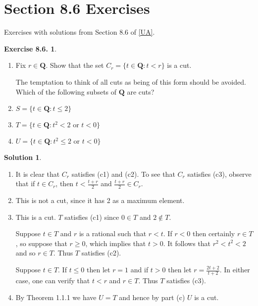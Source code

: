 \documentclass[12pt]{article}
\theoremstyle{definition}
\theoremstyle{exercise}
\newtheorem{exercise}{Exercise 8.6.}
\theoremstyle{solution}
\newtheorem*{solution}{Solution}
\newcommand{\Q}{\mathbf{Q}}
\begin{document}
\section{Section 8.6 Exercises}

Exercises with solutions from Section 8.6 of \hyperlink{ua}{[UA]}.

\begin{exercise}
\label{ex:1}
    \begin{enumerate}
        \item Fix \( r \in \Q \). Show that the set \( C_r = \{ t \in \Q : t < r \} \) is a cut.

        The temptation to think of all cuts as being of this form should be avoided. Which of the following subsets of \( \Q \) are cuts?

        \item \( S = \{ t \in \Q : t \leq 2 \} \)

        \item \( T = \{ t \in \Q : t^2 < 2 \text{ or } t < 0 \} \)

        \item \( U = \{ t \in \Q : t^2 \leq 2 \text{ or } t < 0 \} \)
    \end{enumerate}
\end{exercise}

\begin{solution}
    \begin{enumerate}
        \item It is clear that \( C_r \) satisfies (c1) and (c2). To see that \( C_r \) satisfies (c3), observe that if \( t \in C_r \), then \( t < \tfrac{t + r}{2} \) and \( \tfrac{t + r }{2} \in C_r \).

        \item This is not a cut, since it has 2 as a maximum element.

        \item This is a cut. \( T \) satisfies (c1) since \( 0 \in T \) and \( 2 \not\in T \).
        
        Suppose \( t \in T \) and \( r \) is a rational such that \( r < t \). If \( r < 0 \) then certainly \( r \in T \), so suppose that \( r \geq 0 \), which implies that \( t > 0 \). It follows that \( r^2 < t^2 < 2 \) and so \( r \in T \). Thus \( T \) satisfies (c2).

        Suppose \( t \in T \). If \( t \leq 0 \) then let \( r = 1 \) and if \( t > 0 \) then let \( r = \frac{2t + 2}{t + 2} \). In either case, one can verify that \( t < r \) and \( r \in T \). Thus \( T \) satisfies (c3).

        \item By Theorem 1.1.1 we have \( U = T \) and hence by part (c) \( U \) is a cut.
    \end{enumerate}
\end{solution}
\end{document}
